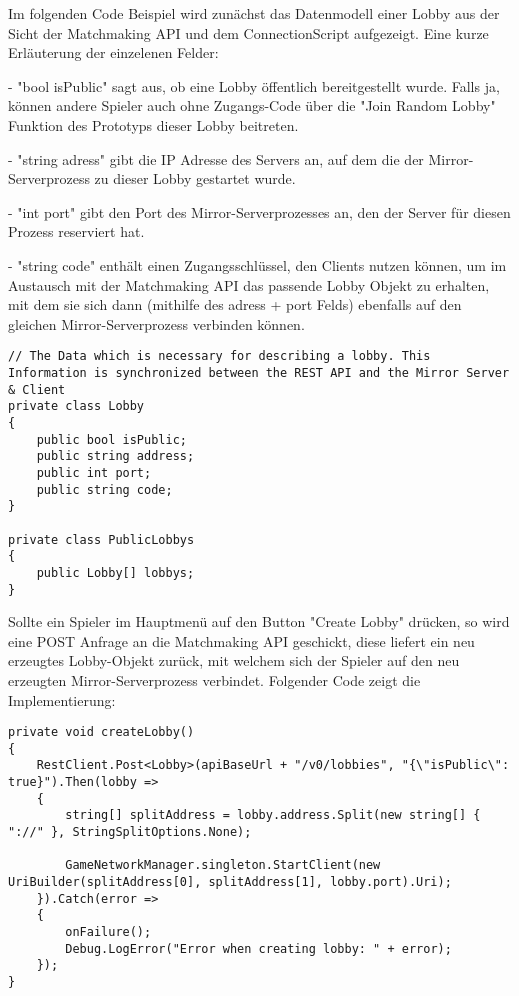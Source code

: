 Im folgenden Code Beispiel wird zunächst das Datenmodell einer Lobby aus der Sicht der Matchmaking API und dem ConnectionScript aufgezeigt. Eine kurze Erläuterung der einzelenen Felder:

- "bool isPublic" sagt aus, ob eine Lobby öffentlich bereitgestellt wurde. Falls ja, können andere Spieler auch ohne Zugangs-Code über die "Join Random Lobby" Funktion des Prototyps dieser Lobby beitreten.

- "string adress" gibt die IP Adresse des Servers an, auf dem die der Mirror-Serverprozess zu dieser Lobby gestartet wurde.

- "int port" gibt den Port des Mirror-Serverprozesses an, den der Server für diesen Prozess reserviert hat.

- "string code" enthält einen Zugangsschlüssel, den Clients nutzen können, um im Austausch mit der Matchmaking API das passende Lobby Objekt zu erhalten, mit dem sie sich dann (mithilfe des adress + port Felds) ebenfalls auf den gleichen Mirror-Serverprozess verbinden können.

\begin{lstlisting}[caption= ConnectionScript.cs Matchmaking Data]
// The Data which is necessary for describing a lobby. This Information is synchronized between the REST API and the Mirror Server & Client
private class Lobby
{
	public bool isPublic;
	public string address;
	public int port;
	public string code;
}

private class PublicLobbys
{
	public Lobby[] lobbys;
}
\end{lstlisting}

Sollte ein Spieler im Hauptmenü auf den Button "Create Lobby" drücken, so wird eine POST Anfrage an die Matchmaking API geschickt, diese liefert ein neu erzeugtes Lobby-Objekt zurück, mit welchem sich der Spieler auf den neu erzeugten Mirror-Serverprozess verbindet. Folgender Code zeigt die Implementierung:

\begin{lstlisting}[caption= ConnectionScript.cs createLobby()]
private void createLobby()
{
	RestClient.Post<Lobby>(apiBaseUrl + "/v0/lobbies", "{\"isPublic\": true}").Then(lobby =>
	{
		string[] splitAddress = lobby.address.Split(new string[] { "://" }, StringSplitOptions.None);
		
		GameNetworkManager.singleton.StartClient(new UriBuilder(splitAddress[0], splitAddress[1], lobby.port).Uri);
	}).Catch(error =>
	{
		onFailure();
		Debug.LogError("Error when creating lobby: " + error);
	});
}	
\end{lstlisting}

